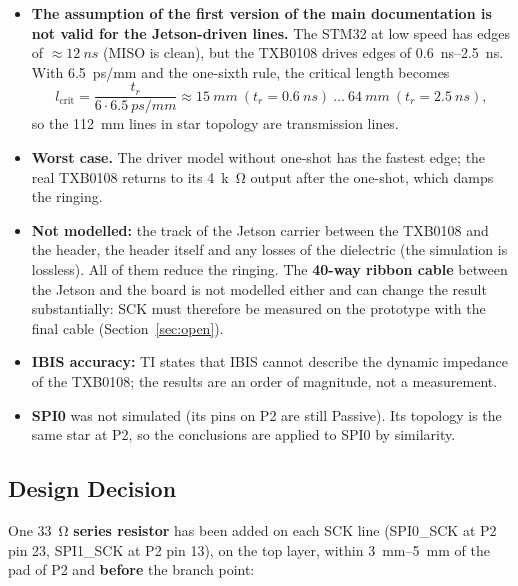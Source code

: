 \documentclass[11pt,a4paper]{article}
\begin{document}
\begin{itemize}
    \item \textbf{The assumption of the first version of the main documentation is not valid for
    the Jetson-driven lines.} The STM32 at low speed has edges of $\approx\qty{12}{ns}$ (MISO is clean),
    but the TXB0108 drives edges of \qtyrange{0.6}{2.5}{ns}. With \qty{6.5}{ps/mm} and the one-sixth rule,
    the critical length becomes
    \[
    l_\text{crit} = \frac{t_r}{6 \cdot \qty{6.5}{ps/mm}} \approx \qty{15}{mm}\ (t_r = \qty{0.6}{ns})\ \dots\ \qty{64}{mm}\ (t_r = \qty{2.5}{ns}),
    \]
    so the \qty{112}{mm} lines in star topology are transmission lines.
    \item \textbf{Worst case.} The driver model without one-shot has the fastest edge; the real TXB0108
    returns to its \qty{4}{k\ohm} output after the one-shot, which damps the ringing.
    \item \textbf{Not modelled:} the track of the Jetson carrier between the TXB0108 and the header, the
    header itself and any losses of the dielectric (the simulation is lossless). All of them reduce
    the ringing. The \textbf{40-way ribbon cable} between the Jetson and the board is not modelled
    either and can change the result substantially: SCK must therefore be measured on the
    prototype with the final cable (Section~\ref{sec:open}).
    \item \textbf{IBIS accuracy:} TI states that IBIS cannot describe the dynamic impedance of the
    TXB0108; the results are an order of magnitude, not a measurement.
    \item \textbf{SPI0} was not simulated (its pins on P2 are still Passive). Its topology is the same star at
    P2, so the conclusions are applied to SPI0 by similarity.
\end{itemize}

\subsection{Design Decision}\label{sec:decision}

One \qty{33}{\ohm} \textbf{series resistor} has been added on each SCK line (SPI0\_SCK at P2 pin 23, SPI1\_SCK
at P2 pin 13), on the top layer, within \qtyrange[range-phrase=--, range-units=single]{3}{5}{mm} of the pad of P2 and \textbf{before} the branch point:

\begin{center}
\end{center}
\end{document}
